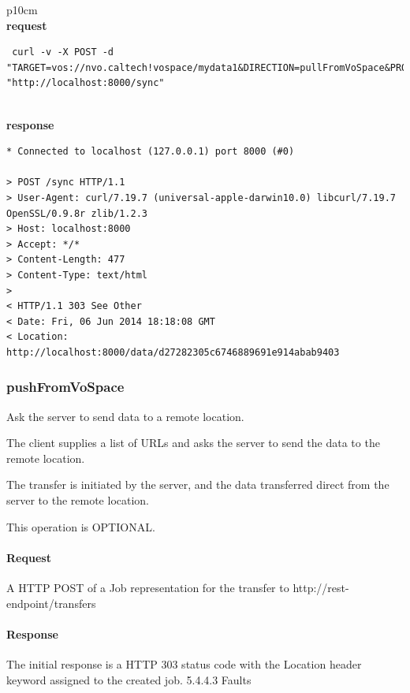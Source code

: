 \documentclass[11pt,a4paper]{ivoa}
\begin{document}
\begin{tabular}{ p{10cm} }
\\
\textbf{request} \\
\begin{lstlisting}
 curl -v -X POST -d "TARGET=vos://nvo.caltech!vospace/mydata1&DIRECTION=pullFromVoSpace&PROTOCOL=ivo://ivoa.net/vospace/core#httpget&REQUEST=redirect" "http://localhost:8000/sync"
 \end{lstlisting} \\
 \textbf{response} \\
 \begin{lstlisting}
* Connected to localhost (127.0.0.1) port 8000 (#0)

> POST /sync HTTP/1.1
> User-Agent: curl/7.19.7 (universal-apple-darwin10.0) libcurl/7.19.7 OpenSSL/0.9.8r zlib/1.2.3
> Host: localhost:8000
> Accept: */*
> Content-Length: 477
> Content-Type: text/html
>
< HTTP/1.1 303 See Other
< Date: Fri, 06 Jun 2014 18:18:08 GMT
< Location: http://localhost:8000/data/d27282305c6746889691e914abab9403
\end{lstlisting}
\end{tabular}

\subsubsection{pushFromVoSpace}
\label{subsubsec:pushfromvospace}
Ask the server to send data to a remote location.

The client supplies a list of URLs and asks the server to send the data to the remote location.

The transfer is initiated by the server, and the data transferred direct from the server to the remote location.

This operation is OPTIONAL.

\paragraph{Request}
A HTTP POST of a Job representation for the transfer to http://rest-endpoint/transfers

\paragraph{Response}
The initial response is a HTTP 303 status code with the Location header keyword assigned to the created job.
5.4.4.3 Faults
\end{document}

